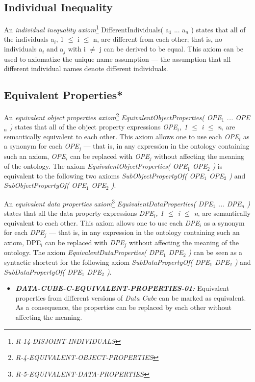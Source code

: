\documentclass{llncs}
\begin{document}
\subsection{Individual Inequality}

An \emph{individual inequality axiom}\footnote{\emph{R-14-DISJOINT-INDIVIDUALS}} DifferentIndividuals( a$_1$ ... a$_n$ ) states that all of the individuals a$_i$, 1 $\leq$ i $\leq$ n, are different from each other; 
that is, no individuals a$_i$ and a$_j$ with i $\neq$ j can be derived to be equal. 
This axiom can be used to axiomatize the unique name assumption — the assumption that all different individual names denote different individuals. 

\subsection{Equivalent Properties*}

An \emph{equivalent object properties axiom}\footnote{\emph{R-4-EQUIVALENT-OBJECT-PROPERTIES}} \emph{EquivalentObjectProperties( OPE$_1$ ... OPE$_n$ )} states that all of the object property expressions \emph{OPE$_i$, 1 $\leq$ i $\leq$ n}, are semantically equivalent to each other. This axiom allows one to use each \emph{OPE$_i$} as a synonym for each \emph{OPE$_j$} — that is, in any expression in the ontology containing such an axiom, \emph{OPE$_i$} can be replaced with \emph{OPE$_j$} without affecting the meaning of the ontology. The axiom \emph{EquivalentObjectProperties( OPE$_1$ OPE$_2$ )} is equivalent to the following two axioms \emph{SubObjectPropertyOf( OPE$_1$ OPE$_2$ )} and \emph{SubObjectPropertyOf( OPE$_1$ OPE$_2$ )}.

An \emph{equivalent data properties axiom}\footnote{\emph{R-5-EQUIVALENT-DATA-PROPERTIES}} \emph{EquivalentDataProperties( DPE$_1$ ... DPE$_n$ )} states that all the data property expressions \emph{DPE$_i$, 1 $\leq$ i $\leq$ n}, are semantically equivalent to each other. This axiom allows one to use each \emph{DPE$_i$} as a synonym for each \emph{DPE$_j$} — that is, in any expression in the ontology containing such an axiom, DPE$_i$ can be replaced with \emph{DPE$_j$} without affecting the meaning of the ontology. The axiom \emph{EquivalentDataProperties( DPE$_1$ DPE$_2$ )} can be seen as a syntactic shortcut for the following axiom \emph{SubDataPropertyOf( DPE$_1$ DPE$_2$ )} and \emph{SubDataPropertyOf( DPE$_1$ DPE$_2$ )}.

\begin{itemize}
	\item \textbf{{\em DATA-CUBE-C-EQUIVALENT-PROPERTIES-01:}}
	Equivalent properties from different versions of \emph{Data Cube} can be marked as equivalent. 
	As a consequence, the properties can be replaced by each other without affecting the meaning.
\end{itemize}
\end{document}
